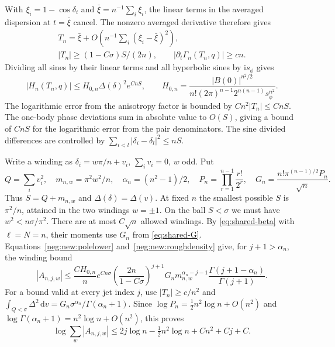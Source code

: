 \documentclass[11pt]{article}
\numberwithin{equation}{section}
\theoremstyle{definition}
\newcommand{\ii}{\mathrm i}
\newcommand{\dd}{\,\mathrm d}
\begin{document}
With $\xi_i=1-\cos\delta_i$ and $\bar\xi=n^{-1}\sum_i\xi_i$, the
linear terms in the averaged dispersion at $t=\bar\xi$ cancel.
The nonzero averaged derivative therefore gives
\begin{equation}
 \begin{gathered}
 T_n=\bar\xi+O\left(n^{-1}\sum_i(\xi_i-\bar\xi)^2\right),\\
 |T_n|\ge(1-C\sigma)S/(2n),\qquad
 |\partial_t\Gamma_n(T_n,q)|\ge cn.
 \end{gathered}                                      \label{neg:new:polelower}
\end{equation}
Dividing all sines by their linear terms and all hyperbolic sines by
$\ii s_\phi$ gives
\begin{equation}
 |H_n(T_n,q)|\le H_{0,n}\Delta(\delta)^2 e^{CnS},\qquad
 H_{0,n}=\frac{|B(0)|^{n^2/2}}
 {n!(2\pi)^{n-1}2^{n(n-1)}s_\phi^{n^2}}.              \label{neg:new:roughdensity}
\end{equation}
The logarithmic error from the anisotropy factor is bounded by
$Cn^2|T_n|\le CnS$. The one-body phase deviations sum in absolute
value to $O(S)$, giving a bound of $CnS$ for the logarithmic error
from the pair denominators. The sine divided differences are controlled
by $\sum_{i<l}|\delta_i-\delta_l|^2\le nS$.

Write a winding as
$\delta_i=w\pi/n+v_i$, $\sum_i v_i=0$, $w$ odd.  Put
\[
 Q=\sum_i v_i^2,\quad m_{n,w}=\pi^2w^2/n,\quad
 \alpha_n=(n^2-1)/2,\quad P_n=\prod_{r=1}^{n-1}\frac{r!}{2^r},
 \quad G_n=\frac{n!\pi^{(n-1)/2}P_n}{\sqrt n}.
\]
Thus $S=Q+m_{n,w}$ and $\Delta(\delta)=\Delta(v)$. At fixed $n$ the
smallest possible $S$ is $\pi^2/n$, attained in the two windings
$w=\pm1$. On the ball $S<\sigma$ we must have $w^2<n\sigma/\pi^2$.
There are at most $C\sqrt n$ allowed windings. By \eqref{eq:shared-beta}
with $\ell=N=n$, their moments use $G_n$ from \eqref{eq:shared-G}.
Equations~\eqref{neg:new:polelower} and~\eqref{neg:new:roughdensity}
give, for $j+1>\alpha_n$, the winding bound
\begin{equation}
 |A_{n,j,w}|\le\frac{CH_{0,n}}n e^{Cn\sigma}
 \left(\frac{2n}{1-C\sigma}\right)^{j+1}
 G_nm_{n,w}^{\alpha_n-j-1}
       \frac{\Gamma(j+1-\alpha_n)}{\Gamma(j+1)}.        \label{neg:new:winding}
\end{equation}
For a bound valid at every jet index $j$, use $|T_n|\ge c/n^2$
and $\int_{Q<\sigma}\Delta^2\dd v
=G_n\sigma^{\alpha_n}/\Gamma(\alpha_n+1)$.  Since
$\log P_n=\tfrac12n^2\log n+O(n^2)$ and
$\log\Gamma(\alpha_n+1)=n^2\log n+O(n^2)$, this proves
\begin{equation}
 \log\sum_w|A_{n,j,w}|
 \le2j\log n-\tfrac12n^2\log n+Cn^2+Cj+C.             \label{neg:new:allindex}
\end{equation}
\end{document}
